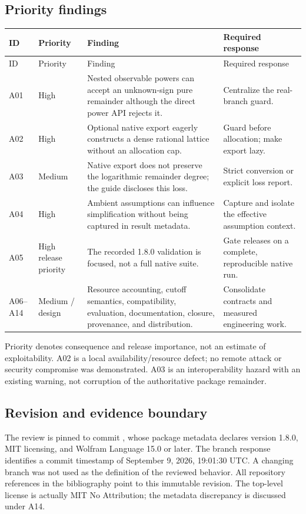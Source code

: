 \subsection{Priority findings}
\begin{longtable}{P{0.09\textwidth}P{0.14\textwidth}P{0.42\textwidth}P{0.24\textwidth}}
\toprule ID & Priority & Finding & Required response \\\midrule
\endfirsthead
\toprule ID & Priority & Finding & Required response \\\midrule
\endhead
A01 & High & Nested observable powers can accept an unknown-sign pure remainder although the direct power API rejects it. & Centralize the real-branch guard. \\
A02 & High & Optional native export eagerly constructs a dense rational lattice without an allocation cap. & Guard before allocation; make export lazy. \\
A03 & Medium & Native export does not preserve the logarithmic remainder degree; the guide discloses this loss. & Strict conversion or explicit loss report. \\
A04 & High & Ambient assumptions can influence simplification without being captured in result metadata. & Capture and isolate the effective assumption context. \\
A05 & High release priority & The recorded 1.8.0 validation is focused, not a full native suite. & Gate releases on a complete, reproducible native run. \\
A06--A14 & Medium / design & Resource accounting, cutoff semantics, compatibility, evaluation, documentation, closure, provenance, and distribution. & Consolidate contracts and measured engineering work. \\
\bottomrule
\end{longtable}
Priority denotes consequence and release importance, not an estimate of exploitability. A02 is a local availability/resource defect; no remote attack or security compromise was demonstrated. A03 is an interoperability hazard with an existing warning, not corruption of the authoritative package remainder.

\subsection{Revision and evidence boundary}
The review is pinned to commit \commit, whose package metadata declares version 1.8.0, MIT licensing, and Wolfram Language 15.0 or later. The branch response identifies a commit timestamp of September 9, 2026, 19:01:30 UTC. A changing  branch was not used as the definition of the reviewed behavior. All repository references in the bibliography point to this immutable revision. The top-level license is actually MIT No Attribution; the metadata discrepancy is discussed under A14.\cite{revision,paclet,license}

